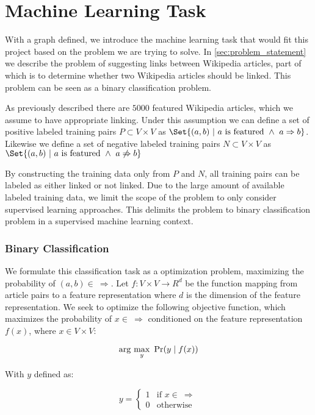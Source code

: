 \section{Machine Learning Task}\label{sec:machine_learning_task}
With a graph defined, we introduce the machine learning task that would fit this project based on the problem we are trying to solve. In \cref{sec:problem_statement} we describe the problem of suggesting links between Wikipedia articles, part of which is to determine whether two Wikipedia articles should be linked. This problem can be seen as a binary classification problem.

As previously described there are $5000$ featured Wikipedia articles, which we assume to have appropriate linking. Under this assumption we can define a set of positive labeled training pairs $P \subset V \times V$ as $\Set{(a,b)\ |\ a\text{ is featured}\ \wedge\ a \Rightarrow b}$. Likewise we define a set of negative labeled training pairs $N \subset V \times V$ as $\Set{(a,b)\ |\ a\text{ is featured}\ \wedge\ a \not\Rightarrow b}$

By constructing the training data only from $P$ and $N$, all training pairs can be labeled as either linked or not linked. Due to the large amount of available labeled training data, we limit the scope of the problem to only consider supervised learning approaches. This delimits the problem to binary classification problem in a supervised machine learning context.

\subsubsection{Binary Classification}

We formulate this classification task as a optimization problem, maximizing the probability of $(a,b) \in \ \Rightarrow$. Let $f: V\times V \to R^d$ be the function mapping from article pairs to a feature representation where $d$ is the dimension of the feature representation.
We seek to optimize the following objective function, which maximizes the probability of $x \in \ \Rightarrow$ conditioned on the feature representation $f(x)$, where $x \in V \times V$:

\begin{equation}
\label{objective}
\arg\ \!\max_y\ \Pr(y \mid f(x))
\end{equation}

With $y$ defined as:

\[
    y=
\begin{cases}
    1 & \text{if } x \in \  \Rightarrow\\
    0 & \text{otherwise}
\end{cases}
\]

